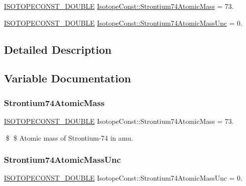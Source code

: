 \begin{DoxyCompactItemize}
\item 
\mbox{\hyperlink{group___isotope_const-_macros_ga8f45a7272ce02c0b4c65c44636ed719a}{I\+S\+O\+T\+O\+P\+E\+C\+O\+N\+S\+T\+\_\+\+D\+O\+U\+B\+LE}} \mbox{\hyperlink{group___isotope_const-_strontium-_sr74_gac1fc4471048b85abb3b1160ca18895c7}{Isotope\+Const\+::\+Strontium74\+Atomic\+Mass}} = 73.
\item 
\mbox{\hyperlink{group___isotope_const-_macros_ga8f45a7272ce02c0b4c65c44636ed719a}{I\+S\+O\+T\+O\+P\+E\+C\+O\+N\+S\+T\+\_\+\+D\+O\+U\+B\+LE}} \mbox{\hyperlink{group___isotope_const-_strontium-_sr74_ga88869a7a3c80d5b13b0f7943aa966fd9}{Isotope\+Const\+::\+Strontium74\+Atomic\+Mass\+Unc}} = 0.
\end{DoxyCompactItemize}


\subsection{Detailed Description}


\subsection{Variable Documentation}
\mbox{\label{group___isotope_const-_strontium-_sr74_gac1fc4471048b85abb3b1160ca18895c7}} 
\subsubsection{\texorpdfstring{Strontium74\+Atomic\+Mass}{Strontium74AtomicMass}}
{\footnotesize\ttfamily \mbox{\hyperlink{group___isotope_const-_macros_ga8f45a7272ce02c0b4c65c44636ed719a}{I\+S\+O\+T\+O\+P\+E\+C\+O\+N\+S\+T\+\_\+\+D\+O\+U\+B\+LE}} Isotope\+Const\+::\+Strontium74\+Atomic\+Mass = 73.}

\$ \$ Atomic mass of Strontium-\/74 in amu. \mbox{\label{group___isotope_const-_strontium-_sr74_ga88869a7a3c80d5b13b0f7943aa966fd9}} 
\subsubsection{\texorpdfstring{Strontium74\+Atomic\+Mass\+Unc}{Strontium74AtomicMassUnc}}
{\footnotesize\ttfamily \mbox{\hyperlink{group___isotope_const-_macros_ga8f45a7272ce02c0b4c65c44636ed719a}{I\+S\+O\+T\+O\+P\+E\+C\+O\+N\+S\+T\+\_\+\+D\+O\+U\+B\+LE}} Isotope\+Const\+::\+Strontium74\+Atomic\+Mass\+Unc = 0.}

